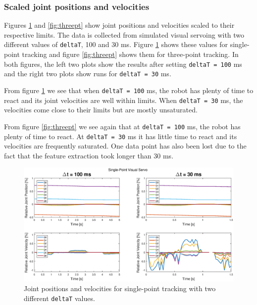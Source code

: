 \documentclass[]{scrartcl}
\begin{document}
\subsubsection*{Scaled joint positions and velocities}
Figures \ref{fig:onept} and \ref{fig:threept} show joint positions and velocities scaled to their respective limits. The data is collected from simulated visual servoing with two different values of \texttt{deltaT}, 100 and 30 ms. Figure \ref{fig:onept} shows these values for single-point tracking and figure \ref{fig:threept} shows them for three-point tracking. In both figures, the left two plots show the results after setting \texttt{deltaT = 100} ms and the right two plots show runs for \texttt{deltaT = 30} ms.\par
From figure \ref{fig:onept} we see that when \texttt{deltaT = 100} ms, the robot has plenty of time to react and its joint velocities are well within limits. When \texttt{deltaT = 30} ms, the velocities come close to their limits but are mostly unsaturated. \par
From figure \ref{fig:threept} we see again that at \texttt{deltaT = 100} ms, the robot has plenty of time to react. At \texttt{deltaT = 30} ms it has little time to react and its velocities are frequently saturated. One data point has also been lost due to the fact that the feature extraction took longer than 30 ms.\par
\begin{figure}
	\centering
	\includegraphics[width=1\linewidth, trim = 75 0 75 0]{fig/onept.eps}
	\caption{Joint positions and velocities for single-point tracking with two different \texttt{deltaT} values.}
	\label{fig:onept}
\end{figure}
\end{document}
